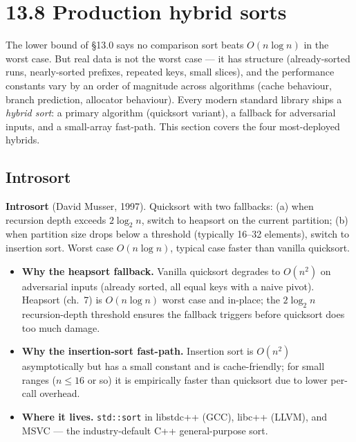 \documentclass[11pt]{article}
\begin{document}
\section{13.8 Production hybrid sorts}

The lower bound of \S13.0 says no comparison sort beats
$O(n \log n)$ in the worst case. But real data is not the
worst case --- it has structure (already-sorted runs,
nearly-sorted prefixes, repeated keys, small slices), and the
performance constants vary by an order of magnitude across
algorithms (cache behaviour, branch prediction, allocator
behaviour). Every modern standard library ships a
\emph{hybrid sort}: a primary algorithm (quicksort variant),
a fallback for adversarial inputs, and a small-array fast-path.
This section covers the four most-deployed hybrids.

\subsection*{Introsort}

\begin{defnbox}
\textbf{Introsort} (David Musser, 1997). Quicksort with two
fallbacks: (a) when recursion depth exceeds $2 \log_2 n$, switch
to heapsort on the current partition; (b) when partition size
drops below a threshold (typically 16--32 elements), switch to
insertion sort. Worst case $O(n \log n)$, typical case faster
than vanilla quicksort.
\end{defnbox}

\begin{itemize}[leftmargin=*]
    \item \textbf{Why the heapsort fallback.} Vanilla quicksort
          degrades to $O(n^2)$ on adversarial inputs (already
          sorted, all equal keys with a naive pivot). Heapsort
          (ch.~7) is $O(n \log n)$ worst case and in-place; the
          $2 \log_2 n$ recursion-depth threshold ensures the
          fallback triggers before quicksort does too much
          damage.
    \item \textbf{Why the insertion-sort fast-path.} Insertion
          sort is $O(n^2)$ asymptotically but has a small
          constant and is cache-friendly; for small ranges
          ($n \le 16$ or so) it is empirically faster than
          quicksort due to lower per-call overhead.
    \item \textbf{Where it lives.} \texttt{std::sort} in
          libstdc++ (GCC), libc++ (LLVM), and MSVC --- the
          industry-default C++ general-purpose sort.
\end{itemize}
\end{document}
